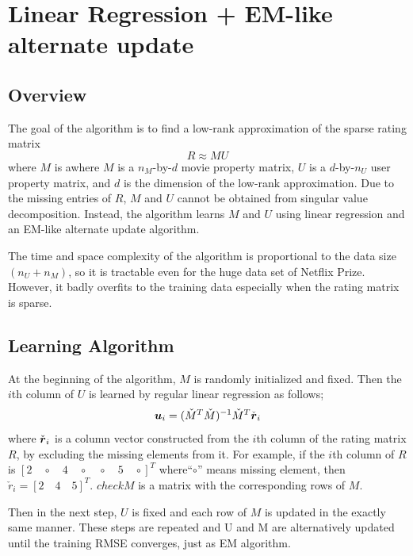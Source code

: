 \documentclass{article}
\begin{document}
\fi

\section{Linear Regression + EM-like alternate update}
\subsection{Overview}
The goal of the algorithm is to find a low-rank approximation of the sparse rating matrix 
\begin{equation}
R \approx MU
\end{equation}
where $M$ is awhere $M$ is a $n_M$-by-$d$ movie property matrix, $U$ is a
$d$-by-$n_U$ user property matrix, and $d$ is the dimension of the
low-rank approximation. Due to the missing entries of $R$, $M$ and $U$
cannot be obtained from singular value decomposition. Instead, the
algorithm learns $M$ and $U$ using linear regression and an EM-like
alternate update algorithm.

The time and space complexity of the algorithm is proportional to the data size $(n_U+n_M)$, so it is tractable even for the huge data set of Netflix Prize. However, it badly overfits to the training data especially when the rating matrix is sparse.

\subsection{Learning Algorithm}

At the beginning of the algorithm, $M$ is randomly initialized and fixed. Then the $i$th column of $U$ is learned by regular linear regression as follows;
\begin{equation}
{\mbox{\boldmath $u$}}_i=(\check{M}^T\check{M})^{-1}\check{M}^T \check{{\mbox{\boldmath $r$}}}_i \label{eq:lrem_core}
\end{equation}
where $\check{{\mbox{\boldmath $r$}}}_i$ is a column vector constructed from the $i$th column of the rating matrix $R$, by excluding the missing elements from it. For example, if the $i$th column of $R$ is $[2 \quad \circ \quad 4 \quad \circ \quad \circ \quad 5 \quad \circ]^T$ where``$\circ$'' means missing element, then $\check{r}_i = [2 \quad 4 \quad 5]^T$. $check{M}$ is a matrix with the corresponding rows of $M$.

Then in the next step, $U$ is fixed and each row of $M$ is updated in the exactly same manner. These steps are repeated and U and M are alternatively updated until the training RMSE converges, just as EM algorithm. 
\end{document}
